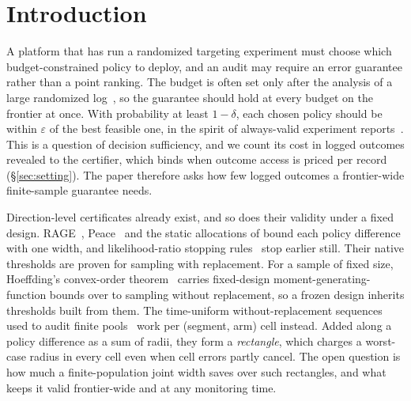 \documentclass[sigconf,anonymous,review]{acmart}
\newcommand{\eps}{\varepsilon}
\begin{document}

\maketitle

\section{Introduction}\label{sec:intro}

A platform that has run a randomized targeting experiment must choose which budget-constrained policy to deploy, and an audit may require an error guarantee rather than a point ranking. The budget is often set only after the analysis of a large randomized log~\citep{diemert2018large}, so the guarantee should hold at every budget on the frontier at once. With probability at least $1-\delta$, each chosen policy should be within $\eps$ of the best feasible one, in the spirit of always-valid experiment reports~\citep{johari2017peeking,howard2021time}. This is a question of decision sufficiency, and we count its cost in logged outcomes revealed to the certifier, which binds when outcome access is priced per record (\S\ref{sec:setting}). The paper therefore asks how few logged outcomes a frontier-wide finite-sample guarantee needs.

Direction-level certificates already exist, and so does their validity under a fixed design. RAGE~\citep{fiez2019sequential}, Peace~\citep{katzsamuels2020empirical} and the static allocations of \citet{soare2014best} bound each policy difference with one width, and likelihood-ratio stopping rules~\citep{garivier2016optimal,jourdan2021efficient} stop earlier still. Their native thresholds are proven for sampling with replacement. For a sample of fixed size, Hoeffding's convex-order theorem~\citep{hoeffding1963probability} carries fixed-design moment-generating-function bounds over to sampling without replacement, so a frozen design inherits thresholds built from them. The time-uniform without-replacement sequences used to audit finite pools~\citep{waudbysmith2020confidence,waudbysmith2024estimating} work per (segment, arm) cell instead. Added along a policy difference as a sum of radii, they form a \emph{rectangle}, which charges a worst-case radius in every cell even when cell errors partly cancel. The open question is how much a finite-population joint width saves over such rectangles, and what keeps it valid frontier-wide and at any monitoring time.
\end{document}
